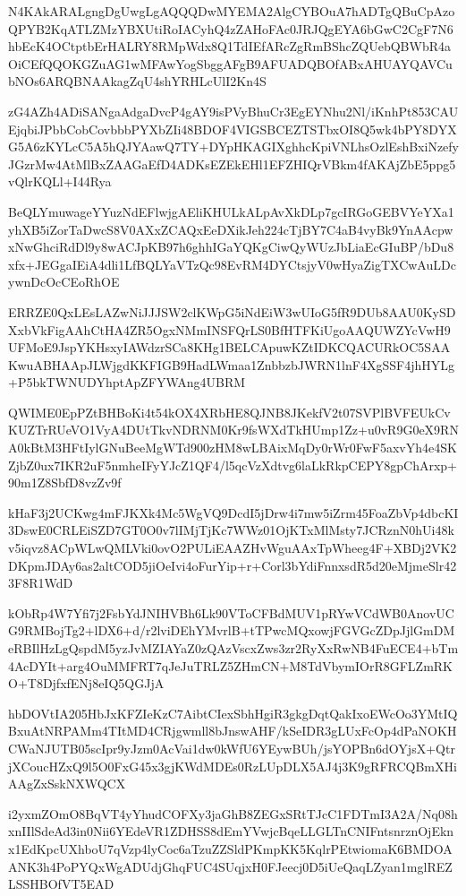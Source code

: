 \documentclass[]{article}
\newenvironment{Shaded}{\begin{snugshade}}{\end{snugshade}}
\newcommand{\NormalTok}[1]{#1}
\begin{document}
\begin{Shaded}
\begin{Highlighting}[]
\NormalTok{N4KAkARALgngDgUwgLgAQQQDwMYEMA2AlgCYBOuA7hADTgQBuCpAzoQPYB2KqATLZMzYBXUtiRoIACyhQ4zZAHoFAc0JRJQgEYA6bGwC2CgF7N6hbEcK4OCtptbErHALRY8RMpWdx8Q1TdIEfARcZgRmBShcZQUebQBWbR4aOiCEfQQOKGZuAG1wMFAwYogSbggAFgB9AFUADQBOfABxAHUAYQAVCubNOs6ARQBNAAkagZqU4shYRHLcUlI2Kn4S}

\NormalTok{zG4AZh4ADiSANgaAdgaDvcP4gAY9isPVyBhuCr3EgEYNhu2Nl/iKnhPt853CAUEjqbiJPbbCobCovbbbPYXbZIi48BDOF4VIGSBCEZTSTbxOI8Q5wk4bPY8DYXG5A6zKYLcC5A5hQJYAawQ7TY+DYpHKAGIXghhcKpiVNLhsOzlEshBxiNzefyJGzrMw4AtMlBxZAAGaEfD4ADKsEZEkEHl1EFZHIQrVBkm4fAKAjZbE5ppg5vQlrKQLl+I44Rya}

\NormalTok{BeQLYmuwageYYuzNdEFlwjgAEliKHULkALpAvXkDLp7gcIRGoGEBVYeYXa1yhXB5iZorTaDwcS8V0AXxZCAQxEeDXikJeh224cTjBY7C4aB4vyBk9YnAAcpwxNwGhciRdDl9y8wACJpKB97h6ghhIGaYQKgCiwQyWUzJbLiaEcGIuBP/bDu8xfx+JEGgaIEiA4dli1LfBQLYaVTzQc98EvRM4DYCtsjyV0wHyaZigTXCwAuLDcywnDcOcCEoRhOE}

\NormalTok{ERRZE0QxLEsLAZwNiJJJSW2clKWpG5iNdEiW3wUIoG5fR9DUb8AAU0KySDXxbVkFigAAhCtHA4ZR5OgxNMmINSFQrLS0BfHTFKiUgoAAQUWZYcVwH9UFMoE9JspYKHsxyIAWdzrSCa8KHg1BELCApuwKZtIDKCQACURkOC5SAAKwuABHAApJLWjgdKKFIGB9HadLWmaa1ZnbbzbJWRN1lnF4XgSSF4jhHYLg+P5bkTWNUDYhptApZFYWAng4UBRM}

\NormalTok{QWIME0EpPZtBHBoKi4t54kOX4XRbHE8QJNB8JKekfV2t07SVPlBVFEUkCvKUZTrRUeVO1VyA4DUtTkvNDRNM0Kr9fsWXdTkHUmp1Zz+u0vR9G0eX9RNA0kBtM3HFtIylGNuBeeMgWTd900zHM8wLBAixMqDy0rWr0FwF5axvYh4e4SKZjbZ0ux7IKR2uF5nmheIFyYJcZ1QF4/l5qcVzXdtvg6laLkRkpCEPY8gpChArxp+90m1Z8SbfD8vzZv9f}

\NormalTok{kHaF3j2UCKwg4mFJKXk4Mc5WgVQ9DcdI5jDrw4i7mw5iZrm45FoaZbVp4dbcKI3DswE0CRLEiSZD7GT0O0v7lIMjTjKc7WWz01OjKTxMlMsty7JCRznN0hUi48kv5iqvz8ACpWLwQMLVki0ovO2PULiEAAZHvWguAAxTpWheeg4F+XBDj2VK2DKpmJDAy6as2altCOD5jiOeIvi4oFurYip+r+Corl3bYdiFnnxsdR5d20eMjmeSlr423F8R1WdD}

\NormalTok{kObRp4W7Yfi7j2FsbYdJNIHVBh6Lk90VToCFBdMUV1pRYwVCdWB0AnovUCG9RMBojTg2+lDX6+d/r2lviDEhYMvrlB+tTPwcMQxowjFGVGcZDpJjlGmDMeRBIlHzLgQspdM5yzJvMZIAYaZ0zQAzVscxZws3zr2RyXxRwNB4FuECE4+bTm4AcDYIt+arg4OuMMFRT7qJeJuTRLZ5ZHmCN+M8TdVbymIOrR8GFLZmRKO+T8DjfxfENj8eIQ5QGJjA}

\NormalTok{hbDOVtIA205HbJxKFZIeKzC7AibtCIexSbhHgiR3gkgDqtQakIxoEWcOo3YMtIQBxuAtNRPAMm4TItMD4CRjgwmll8bJnswAHF/kSeIDR3gLUxFcOp4dPaNOKHCWaNJUTB05scIpr9yJzm0AcVai1dw0kWfU6YEywBUh/jsYOPBn6dOYjsX+QtrjXCoucHZxQ9l5O0FxG45x3gjKWdMDEs0RzLUpDLX5AJ4j3K9gRFRCQBmXHiAAgZxSskNXWQCX}

\NormalTok{i2yxmZOmO8BqVT4yYhudCOFXy3jaGhB8ZEGxSRtTJcC1FDTmI3A2A/Nq08hxnIIlSdeAd3in0Nii6YEdeVR1ZDHSS8dEmYVwjcBqeLLGLTnCNIFntsnrznOjEknx1EdKpcUXhboU7qVzp4lyCoc6aTzuZZSldPKmpKK5KqlrPEtwiomaK6BMDOAANK3h4PoPYQxWgADUdjGhqFUC4SUqjxH0FJeecj0D5iUeQaqLZyan1mglREZLSSHBOfVT5EAD}


\end{Highlighting}
\end{Shaded}
\end{document}

